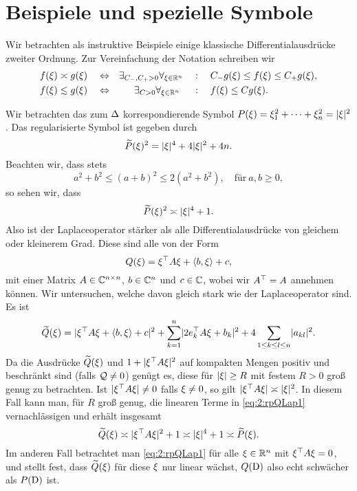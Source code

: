\section{Beispiele und spezielle Symbole}

Wir betrachten als instruktive Beispiele
einige klassische Differentialausdrücke zweiter Ordnung.
Zur Vereinfachung der Notation schreiben wir
\begin{align}
f(\x)\asymp g(\x)\quad&\gdw&
\exists_{C_-,C_+>0}\forall_{\x\in\R^n}\quad&:\quad C_-g(\x)\leq f(\x)\leq C_+g(\x),\\
f(\x)\apprle g(\x)\quad&\gdw&
\exists_{C>0}\forall_{\x\in\R^n}~\quad&:\quad f(\x)\leq Cg(\x).
\end{align}

\begin{exa}\label{exa:2:lap}
Wir betrachten das zum  $\Delta$
korrespondierende Symbol $P(\xi)=\xi_1^2+\dots+\xi_n^2=\lvert\xi\rvert^2$.
Das regularisierte Symbol ist gegeben durch
\begin{equation}
\widetilde{P}(\xi)^2=\lvert\xi\rvert^4+4\lvert\xi\rvert^2+4n.
\end{equation}
Beachten wir, dass stets
\begin{equation}\label{eq:2:sqrest}
a^2+b^2\leq(a+b)^2\leq2(a^2+b^2),\quad\text{für}~a,b\geq0,
\end{equation}
so sehen wir, dass
\begin{equation}
\widetilde{P}(\xi)^2\asymp\lvert\xi\rvert^4+1.
\end{equation}
Also ist der Laplaceoperator stärker als alle Differentialausdrücke von gleichem oder kleinerem Grad.
Diese sind alle von der Form
\begin{equation}
Q(\xi)=\xi^\top A\xi+\langle b,\xi\rangle+c,
\end{equation}
mit einer Matrix $A\in\mathbb C^{n\times n}$, $b\in\mathbb C^n$ und $c\in\mathbb C$,
wobei wir $A^\top=A$ annehmen können.
Wir untersuchen, welche davon gleich stark wie der Laplaceoperator sind.
Es ist
\begin{equation}\label{eq:2:rpQLap1}
\widetilde{Q}(\xi)=\lvert\xi^\top A\xi+\langle b,\xi\rangle+c\rvert^2+\sum_{k=1}^n\lvert2e^\top_kA\xi+b_k\rvert^2
+4\sum_{1\leq k\leq l\leq n}\lvert a_{kl}\rvert^2.
\end{equation}
Da die Ausdrücke $\widetilde{Q}(\xi)$ und $1+\lvert\xi^\top A\xi\rvert^2$
auf kompakten Mengen positiv und beschränkt sind (falls $\mathcal Q\neq0$) genügt es,
diese für $\lvert\xi\rvert\geq R$ mit festem $R>0$ groß genug zu betrachten.
Ist $\lvert\xi^\top A\xi\rvert\neq0$ falls $\xi\neq0$,
so gilt $\lvert\xi^\top A\xi\rvert\asymp\lvert\xi\rvert^2$.
In diesem Fall kann man, für $R$ groß genug,
die linearen Terme in \eqref{eq:2:rpQLap1} vernachlässigen
und erhält insgesamt
\begin{equation}
\widetilde{Q}(\xi)\asymp\lvert\xi^\top A\xi\rvert^2+1\asymp\lvert\xi\rvert^4+1\asymp\widetilde{P}(\xi).
\end{equation}
Im anderen Fall betrachtet man \eqref{eq:2:rpQLap1}
für alle $\xi\in\mathbb R^n$ mit $\xi^\top A\xi=0$,
und stellt fest, dass $\widetilde{Q}(\xi)$ für diese $\xi$ nur linear wächst,
$Q(\mathrm D)$ also echt schwächer als $P(\mathrm D)$ ist.


\end{exa}
